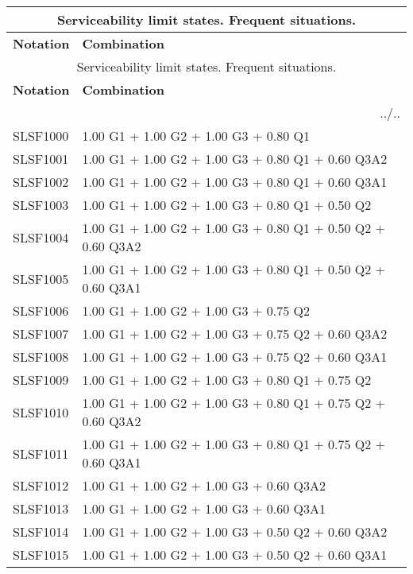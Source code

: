 \begin{center}
\begin{small}
\begin{longtable}{|l|p{10cm}|}
\hline
\multicolumn{2}{|c|}{Serviceability limit states. Frequent situations.}\\
\hline
\textbf{Notation} & \textbf{Combination} \\
\hline
\endfirsthead
\hline
\multicolumn{2}{|c|}{Serviceability limit states. Frequent situations.}\\
\hline
\textbf{Notation} & \textbf{Combination} \\
\hline
\endhead
\hline \multicolumn{2}{|r|}{{../..}} \\ \hline
\endfoot
\hline
\endlastfoot
SLSF1000 & 1.00 G1 + 1.00 G2 + 1.00 G3 + 0.80 Q1\\
SLSF1001 & 1.00 G1 + 1.00 G2 + 1.00 G3 + 0.80 Q1 + 0.60 Q3A2\\
SLSF1002 & 1.00 G1 + 1.00 G2 + 1.00 G3 + 0.80 Q1 + 0.60 Q3A1\\
SLSF1003 & 1.00 G1 + 1.00 G2 + 1.00 G3 + 0.80 Q1 + 0.50 Q2\\
SLSF1004 & 1.00 G1 + 1.00 G2 + 1.00 G3 + 0.80 Q1 + 0.50 Q2 + 0.60 Q3A2\\
SLSF1005 & 1.00 G1 + 1.00 G2 + 1.00 G3 + 0.80 Q1 + 0.50 Q2 + 0.60 Q3A1\\
SLSF1006 & 1.00 G1 + 1.00 G2 + 1.00 G3 + 0.75 Q2\\
SLSF1007 & 1.00 G1 + 1.00 G2 + 1.00 G3 + 0.75 Q2 + 0.60 Q3A2\\
SLSF1008 & 1.00 G1 + 1.00 G2 + 1.00 G3 + 0.75 Q2 + 0.60 Q3A1\\
SLSF1009 & 1.00 G1 + 1.00 G2 + 1.00 G3 + 0.80 Q1 + 0.75 Q2\\
SLSF1010 & 1.00 G1 + 1.00 G2 + 1.00 G3 + 0.80 Q1 + 0.75 Q2 + 0.60 Q3A2\\
SLSF1011 & 1.00 G1 + 1.00 G2 + 1.00 G3 + 0.80 Q1 + 0.75 Q2 + 0.60 Q3A1\\
SLSF1012 & 1.00 G1 + 1.00 G2 + 1.00 G3 + 0.60 Q3A2\\
SLSF1013 & 1.00 G1 + 1.00 G2 + 1.00 G3 + 0.60 Q3A1\\
SLSF1014 & 1.00 G1 + 1.00 G2 + 1.00 G3 + 0.50 Q2 + 0.60 Q3A2\\
SLSF1015 & 1.00 G1 + 1.00 G2 + 1.00 G3 + 0.50 Q2 + 0.60 Q3A1\\
\hline
\end{longtable}
\end{small}
\end{center}
